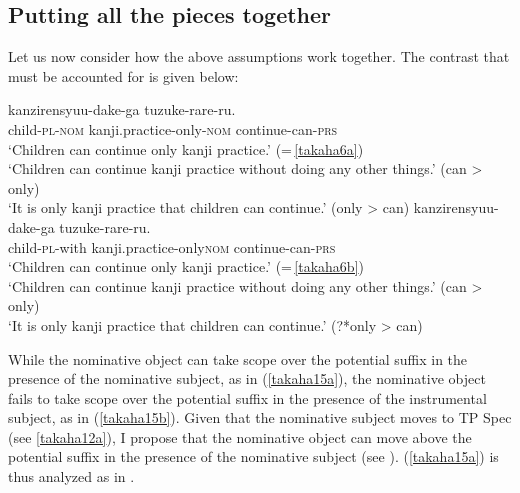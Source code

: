 \documentclass[output=paper]{langscibook}
\begin{document}
\subsection{Putting all the pieces together}
Let us now consider how the above assumptions work together. The contrast that must be accounted for is given below:

\begin{exe}
\ex \label{takaha15}
\begin{xlist}
\ex \label{takaha15a}
 {kanzirensyuu-dake-ga} {tuzuke-rare-ru.}\\
	child-\textsc{pl}-\textsc{nom}  kanji.practice-only-\textsc{nom} continue-can-\textsc{prs}\\
\glt `Children can continue only kanji practice.’ (=\,\ref{takaha6a})\\ 
	`Children can continue kanji practice without doing	any other things.’ (can \textgreater{} only)\\
	‘It is only kanji practice that children can continue.’ (only \textgreater{} can)
\ex \label{takaha15b}
 {kanzirensyuu-dake-ga} {tuzuke-rare-ru.}\\
	child-\textsc{pl}-with       kanji.practice-only\textsc{nom} continue-can-\textsc{prs}\\
\glt ‘Children can continue only kanji practice.’ (=\,\ref{takaha6b}) \\
‘Children can continue kanji practice without doing any	other things.’ (can \textgreater{} only)\\
‘It is only kanji practice that children can continue.’ (?*only \textgreater{} can)
\end{xlist}
\end{exe}

While the nominative object can take scope over the potential suffix in the presence of the nominative subject, as in (\ref{takaha15a}), the nominative object fails to take scope over the potential suffix in the presence of the instrumental subject, as in (\ref{takaha15b}). Given that the nominative subject moves to TP Spec (see \ref{takaha12a}), I propose that the nominative object can move above the potential suffix in the presence of the nominative subject (see \citealt{ Koizumi1998, nomura2005}). (\ref{takaha15a}) is thus analyzed as in .
\end{document}
